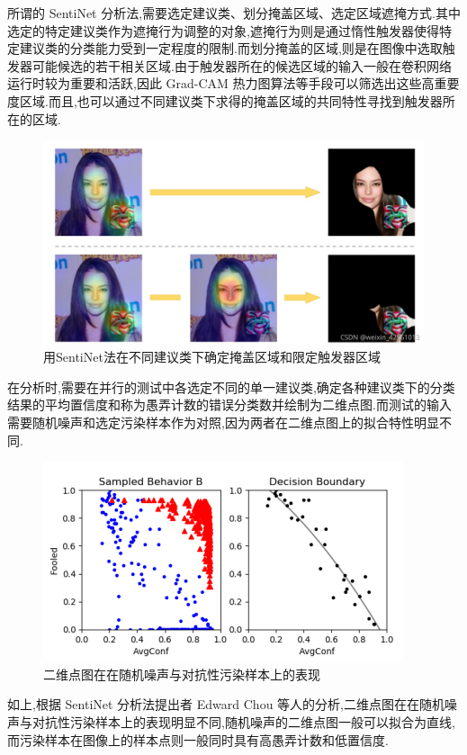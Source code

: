 \begin{enumerate}
	所谓的 SentiNet 分析法,需要选定建议类、划分掩盖区域、选定区域遮掩方式.其中选定的特定建议类作为遮掩行为调整的对象,遮掩行为则是通过惰性触发器使得特定建议类的分类能力受到一定程度的限制.而划分掩盖的区域,则是在图像中选取触发器可能候选的若干相关区域.由于触发器所在的候选区域的输入一般在卷积网络运行时较为重要和活跃,因此 Grad-CAM 热力图算法等手段可以筛选出这些高重要度区域.而且,也可以通过不同建议类下求得的掩盖区域的共同特性寻找到触发器所在的区域.
	
	\begin{figure}
		\centering
		\includegraphics[scale=0.3]{Figures/gradcam.jpg}
		\caption{用SentiNet法在不同建议类下确定掩盖区域和限定触发器区域}
	\end{figure}
	
	在分析时,需要在并行的测试中各选定不同的单一建议类,确定各种建议类下的分类结果的平均置信度和称为愚弄计数的错误分类数并绘制为二维点图.而测试的输入需要随机噪声和选定污染样本作为对照,因为两者在二维点图上的拟合特性明显不同.

	\begin{figure}
		\centering
		\includegraphics[scale=1.2]{Figures/sentinet2.png}
		\caption{二维点图在在随机噪声与对抗性污染样本上的表现}
	\end{figure}

	如上,根据 SentiNet 分析法提出者 Edward Chou 等人的分析,二维点图在在随机噪声与对抗性污染样本上的表现明显不同,随机噪声的二维点图一般可以拟合为直线,而污染样本在图像上的样本点则一般同时具有高愚弄计数和低置信度\cite{sentinet}.
	

\end{enumerate}
